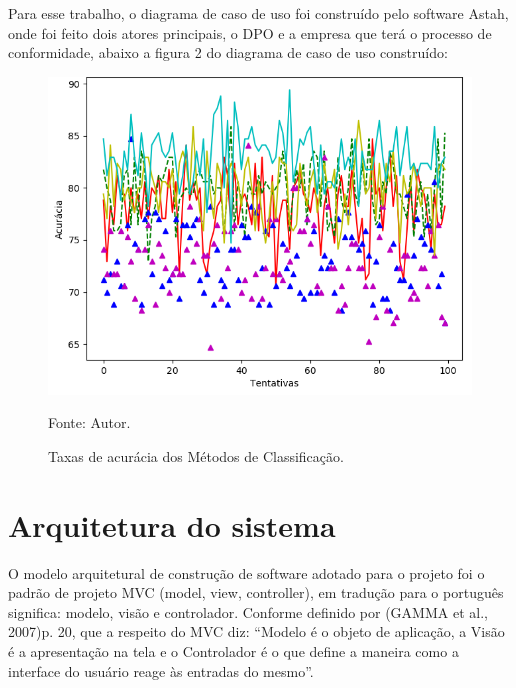 \documentclass[
	12pt,				%
	openright,			%
	oneside,			%
	a4paper,			%
	english,			%
	french,				%
	spanish,			%
	brazil,				%
	]{abntex2}
\begin{document}
Para esse trabalho, o diagrama de caso de uso foi construído pelo software Astah, onde foi feito dois atores principais, o DPO e a empresa que terá o processo de conformidade, abaixo a figura 2 do diagrama de caso de uso construído:

\begin{figure}[ht]
    \centering
    \caption{Taxas de acurácia dos Métodos de Classificação.}
    \includegraphics[width=5.0in]{Images/acc-classification.png}
    \label{fig: grafico-acc}
    
    \centering \small Fonte: Autor.
\end{figure}

\section{Arquitetura do sistema}

O modelo arquitetural de construção de software adotado para o projeto foi o padrão de projeto MVC (model, view, controller), em tradução para o português significa: modelo, visão e controlador. Conforme definido por (GAMMA et al., 2007)p. 20, que a respeito do MVC diz:  “Modelo é o objeto de aplicação, a Visão é a apresentação na tela e o Controlador é o que define a maneira como a interface do usuário reage às entradas do mesmo”.
\end{document}
